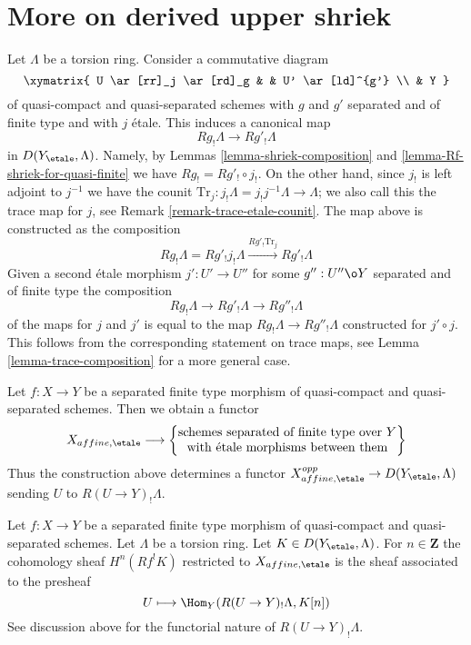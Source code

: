 \section{More on derived upper shriek}
\label{section-more-derived-upper-shriek}

\noindent
Let $\Lambda$ be a torsion ring. Consider a commutative diagram
$$
\xymatrix{
U \ar[rr]_j \ar[rd]_g & & U' \ar[ld]^{g'} \\
& Y
}
$$
of quasi-compact and quasi-separated schemes with $g$ and $g'$
separated and of finite type and with $j$ \'etale. This induces
a canonical map
$$
Rg_!\Lambda \longrightarrow Rg'_!\Lambda
$$
in $D(Y_\etale, \Lambda)$. Namely, by Lemmas \ref{lemma-shriek-composition}
and \ref{lemma-Rf-shriek-for-quasi-finite} we have $Rg_! = Rg'_! \circ j_!$.
On the other hand, since $j_!$ is left adjoint to $j^{-1}$ we have
the counit $\text{Tr}_j : j_!\Lambda = j_!j^{-1}\Lambda \to \Lambda$;
we also call this the trace map for $j$, see
Remark \ref{remark-trace-etale-counit}.
The map above is constructed as the composition
$$
Rg_!\Lambda = Rg'_!j_!\Lambda
\xrightarrow{Rg'_! \text{Tr}_j}
Rg'_!\Lambda
$$
Given a second \'etale morphism $j' : U' \to U''$
for some $g'' : U'' \o Y$ separated and of finite type
the composition
$$
Rg_!\Lambda \longrightarrow Rg'_!\Lambda \longrightarrow Rg''_!\Lambda
$$
of the maps for $j$ and $j'$ is equal to the map
$Rg_!\Lambda \longrightarrow Rg''_!\Lambda$ constructed for $j' \circ j$.
This follows from the corresponding statement on trace maps,
see Lemma \ref{lemma-trace-composition} for a more general case.

\medskip\noindent
Let $f : X \to Y$ be a separated finite type morphism of quasi-compact
and quasi-separated schemes. Then we obtain a functor
$$
X_{affine, \etale}
\longrightarrow
\left\{
\begin{matrix}
\text{schemes separated of finite type over }Y\\
\text{with \'etale morphisms between them}
\end{matrix}
\right\}
$$
Thus the construction above determines a functor
$X_{affine, \etale}^{opp} \to D(Y_\etale, \Lambda)$
sending $U$ to $R(U \to Y)_!\Lambda$.

\begin{lemma}
\label{lemma-describe-Rf-upper-shriek}
Let $f : X \to Y$ be a separated finite type morphism of quasi-compact
and quasi-separated schemes. Let $\Lambda$ be a torsion ring.
Let $K \in D(Y_\etale, \Lambda)$. For $n \in \mathbf{Z}$ the
cohomology sheaf $H^n(Rf^!K)$ restricted to $X_{affine, \etale}$
is the sheaf associated to the presheaf
$$
U \longmapsto \Hom_Y(R(U \to Y)_!\Lambda, K[n])
$$
See discussion above for the functorial nature of $R(U \to Y)_!\Lambda$.
\end{lemma}

